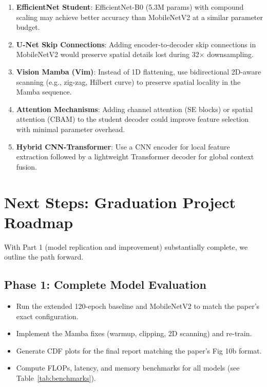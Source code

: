 \documentclass[11pt,a4paper]{article}
\begin{document}
\begin{enumerate}[leftmargin=*]
    \item \textbf{EfficientNet Student}: EfficientNet-B0 (5.3M params) with compound scaling may achieve better accuracy than MobileNetV2 at a similar parameter budget.

    \item \textbf{U-Net Skip Connections}: Adding encoder-to-decoder skip connections in MobileNetV2 would preserve spatial details lost during 32$\times$ downsampling.

    \item \textbf{Vision Mamba (Vim)}: Instead of 1D flattening, use bidirectional 2D-aware scanning (e.g., zig-zag, Hilbert curve) to preserve spatial locality in the Mamba sequence.

    \item \textbf{Attention Mechanisms}: Adding channel attention (SE blocks) or spatial attention (CBAM) to the student decoder could improve feature selection with minimal parameter overhead.

    \item \textbf{Hybrid CNN-Transformer}: Use a CNN encoder for local feature extraction followed by a lightweight Transformer decoder for global context fusion.
\end{enumerate}

\section{Next Steps: Graduation Project Roadmap}

With Part 1 (model replication and improvement) substantially complete, we outline the path forward.

\subsection{Phase 1: Complete Model Evaluation}

\begin{itemize}[leftmargin=*]
    \item Run the extended 120-epoch baseline and MobileNetV2 to match the paper's exact configuration.
    \item Implement the Mamba fixes (warmup, clipping, 2D scanning) and re-train.
    \item Generate CDF plots for the final report matching the paper's Fig 10b format.
    \item[\checkmark] Compute FLOPs, latency, and memory benchmarks for all models (see Table~\ref{tab:benchmarks}).
\end{itemize}
\end{document}
